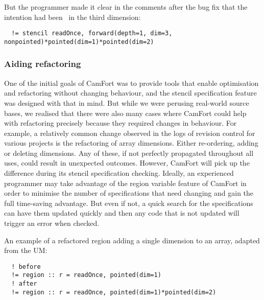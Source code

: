 But the programmer made it clear in the comments after the bug fix
that the intention had been \forward\ in the third dimension:

\begin{verbatim}
  != stencil readOnce, forward(depth=1, dim=3, nonpointed)*pointed(dim=1)*pointed(dim=2)
\end{verbatim}


\subsubsection{Aiding refactoring}

One of the initial goals of CamFort was to provide tools that enable
optimisation and refactoring without changing behaviour, and the
stencil specification feature was designed with that in mind. But
while we were perusing real-world source bases, we realised that there
were also many cases where CamFort could help with refactoring
precisely because they required changes in behaviour. For example, a
relatively common change observed in the logs of revision control for
various projects is the refactoring of array dimensions. Either
re-ordering, adding or deleting dimensions. Any of these, if not
perfectly propagated throughout all uses, could result in unexpected
outcomes. However, CamFort will pick up the difference during its
stencil specification checking. Ideally, an experienced programmer may
take advantage of the region variable feature of CamFort in order to
minimise the number of specifications that need changing and gain the
full time-saving advantage. But even if not, a quick search for the
specifications can have them updated quickly and then any code that is
not updated will trigger an error when checked.

An example of a refactored region adding a single dimension to an array, adapted from the UM:
\begin{verbatim}
  ! before
  != region :: r = readOnce, pointed(dim=1)
  ! after
  != region :: r = readOnce, pointed(dim=1)*pointed(dim=2)
\end{verbatim}


